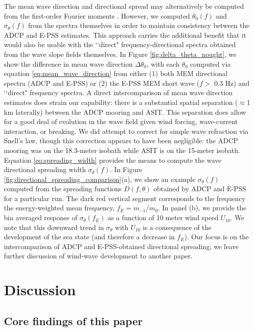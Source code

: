 \documentclass[letterpaper,journal]{IEEEtran}
\begin{document}
The mean wave direction and directional spread may alternatively be computed from the first-order Fourier moments \cite{earle_nondirectional_2003}. However, we computed $\theta_0(f)$ and $\sigma_\theta(f)$ from the spectra themselves in order to maintain consistency between the ADCP and E-PSS estimates. This approach carries the additional benefit that it would also be usable with the \lq\lq direct" frequency-directional spectra obtained from the wave slope fields themselves. In Figure \ref{fig:delta_theta_nought}, we show the difference in mean wave direction $\Delta\theta_0$, with each $\theta_0$ computed via equation \ref{eq:mean_wave_direction} from either (1) both MEM directional spectra (ADCP and E-PSS) or (2) the E-PSS MEM short wave ($f>$ 0.3 Hz) and \lq\lq direct" frequency spectra. A direct intercomparison of mean wave direction estimates does strain our capability: there is a substantial spatial separation ($\approx$1 km laterally) between the ADCP mooring and ASIT. This separation does allow for a good deal of evolution in the wave field given wind forcing, wave-current interaction, or breaking. We did attempt to correct for simple wave refraction via Snell's law, though this correction appears to have been negligible: the ADCP mooring was on the 18.3-meter isobath while ASIT is on the 15-meter isobath. Equation \ref{eq:spreading_width} provides the means to compute the wave directional spreading width $\sigma_\theta(f)$. In Figure \ref{fig:directional_spreading_comparison}(a), we show an example $\sigma_\theta(f)$ computed from the spreading functions $D(f,\theta)$ obtained by ADCP and E-PSS for a particular run. The dark red vertical segment corresponds to the frequency the energy-weighted mean frequency, $f_E=m_{-1}/m_{0}$. In panel (b), we provide the bin averaged response of $\sigma_\theta(f_E)$ as a function of 10 meter wind speed $U_{10}$. We note that this downward trend in $\sigma_\theta$ with $U_{10}$ is a consequence of the development of the sea state (and therefore a decrease in $f_E$). Our focus is on the intercomparison of ADCP and E-PSS-obtained directional spreading; we leave further discussion of wind-wave development to another paper.

\newpage


\section{Discussion}
\label{sec:discussion}

\subsection{Core findings of this paper}
\end{document}
